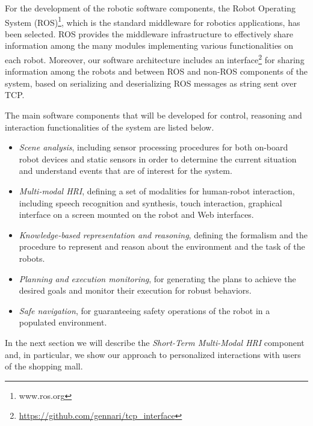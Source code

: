 For the development of the robotic software components, the Robot Operating System (ROS)\footnote{www.ros.org}, which is the standard middleware for robotics applications, has been selected.
ROS provides the middleware infrastructure to effectively share information among the many modules implementing various functionalities on each robot. Moreover, our software architecture includes an interface\footnote{\url{https://github.com/gennari/tcp\_interface}} for sharing information among the robots and between ROS and non-ROS components of the system, based on serializing and deserializing ROS messages as string sent over TCP.

The main software components that will be developed for control, reasoning and interaction functionalities of the system are listed below.

\vspace{-1em}
\begin{itemize}
\item \emph{Scene analysis}, including sensor processing procedures for both on-board robot devices and static sensors in order to determine the current situation and understand events that are of interest for the system.

\item \emph{Multi-modal HRI}, defining a set of modalities for human-robot interaction, including speech recognition and synthesis, touch interaction, graphical interface on a screen mounted on the robot and Web interfaces.

\item \emph{Knowledge-based representation and reasoning}, defining the formalism and the procedure to represent and reason about the environment and the task of the robots.

\item \emph{Planning and execution monitoring}, for generating the plans to achieve the desired goals and monitor their execution for robust behaviors.

\item \emph{Safe navigation}, for guaranteeing safety operations of the robot in a populated environment.

\end{itemize}

In the next section we will describe the \emph{Short-Term Multi-Modal HRI} component
and, in particular, we show our approach to personalized interactions with users of the shopping mall.

